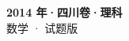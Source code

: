 \documentclass[zihao=-4, a4paper]{ctexart}
\begin{document}
\begin{center}
  {\Large\bfseries 2014 年·四川卷·理科}\\[4pt]
  {\large 数学 · 试题版}
\end{center}
\medskip
{}

\end{document}
